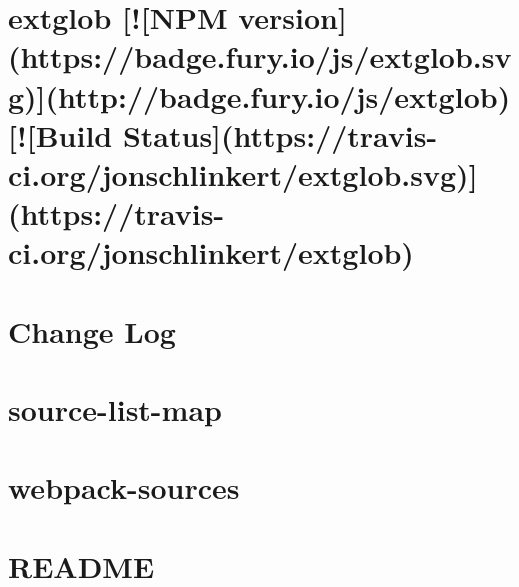 \documentclass[twoside]{book}
\newcommand{\+}{\discretionary{\mbox{\scriptsize$\hookleftarrow$}}{}{}}
\begin{document}
\chapter{extglob \mbox{[}!\mbox{[}N\+PM version\mbox{]}(https\+://badge.fury.\+io/js/extglob.svg)\mbox{]}(http\+://badge.fury.\+io/js/extglob) \mbox{[}!\mbox{[}Build Status\mbox{]}(https\+://travis-\/ci.org/jonschlinkert/extglob.svg)\mbox{]}(https\+://travis-\/ci.org/jonschlinkert/extglob)}
\label{md__c_1_workspace_demo_src_main_script_node_modules_extglob__r_e_a_d_m_e}

\chapter{Change Log}
\label{md__c_1_workspace_demo_src_main_script_node_modules_extract-text-webpack-plugin__c_h_a_n_g_e_l_o_g}

\chapter{source-\/list-\/map}
\label{md__c_1_workspace_demo_src_main_script_node_modules_extract-text-webpack-plugin_node_modules_source-list-map__r_e_a_d_m_e}

\chapter{webpack-\/sources}
\label{md__c_1_workspace_demo_src_main_script_node_modules_extract-text-webpack-plugin_node_modules_webpack-sources__r_e_a_d_m_e}

\chapter{R\+E\+A\+D\+ME}
\label{md__c_1_workspace_demo_src_main_script_node_modules_extract-text-webpack-plugin__r_e_a_d_m_e}

\end{document}
